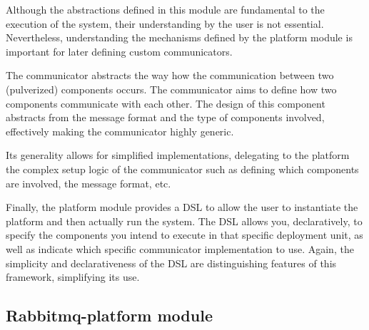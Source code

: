 Although the abstractions defined in this module are fundamental to the execution of the system, their understanding by the user is not essential.
Nevertheless, understanding the mechanisms defined by the platform module is important for later defining custom communicators.

The communicator abstracts the way how the communication between two (pulverized) components occurs. 
The communicator aims to define how two components communicate with each other. The design of this component abstracts from the message
format and the type of components involved, effectively making the communicator highly generic.

Its generality allows for simplified implementations, delegating to the platform the complex setup logic of the communicator such as defining which
components are involved, the message format, etc.

Finally, the platform module provides a DSL to allow the user to instantiate the platform and then actually run the system.
The DSL allows you, declaratively, to specify the components you intend to execute in that specific deployment unit, as well as indicate which
specific communicator implementation to use.
Again, the simplicity and declarativeness of the DSL are distinguishing features of this framework, simplifying its use.


\subsection{Rabbitmq-platform module}
\label{sec:rabbitmq-platform-module}